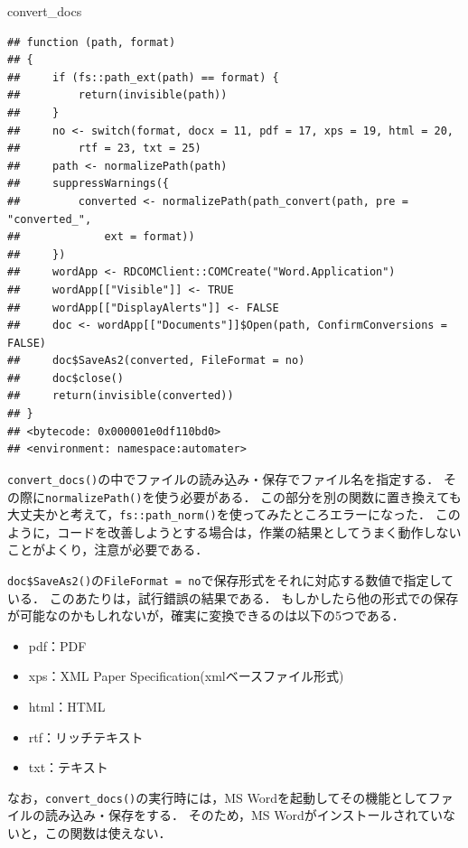 \documentclass[
]{article}
\newenvironment{Shaded}{\begin{snugshade}}{\end{snugshade}}
\newcommand{\NormalTok}[1]{#1}
\providecommand{\tightlist}{%
  \setlength{\itemsep}{0pt}\setlength{\parskip}{0pt}}
\begin{document}
\begin{Shaded}
\begin{Highlighting}[]
\NormalTok{convert\_docs}
\end{Highlighting}
\end{Shaded}

\begin{verbatim}
## function (path, format) 
## {
##     if (fs::path_ext(path) == format) {
##         return(invisible(path))
##     }
##     no <- switch(format, docx = 11, pdf = 17, xps = 19, html = 20, 
##         rtf = 23, txt = 25)
##     path <- normalizePath(path)
##     suppressWarnings({
##         converted <- normalizePath(path_convert(path, pre = "converted_", 
##             ext = format))
##     })
##     wordApp <- RDCOMClient::COMCreate("Word.Application")
##     wordApp[["Visible"]] <- TRUE
##     wordApp[["DisplayAlerts"]] <- FALSE
##     doc <- wordApp[["Documents"]]$Open(path, ConfirmConversions = FALSE)
##     doc$SaveAs2(converted, FileFormat = no)
##     doc$close()
##     return(invisible(converted))
## }
## <bytecode: 0x000001e0df110bd0>
## <environment: namespace:automater>
\end{verbatim}

\texttt{convert\_docs()}の中でファイルの読み込み・保存でファイル名を指定する．
その際に\texttt{normalizePath()}を使う必要がある．
この部分を別の関数に置き換えても大丈夫かと考えて，\texttt{fs::path\_norm()}を使ってみたところエラーになった．
このように，コードを改善しようとする場合は，作業の結果としてうまく動作しないことがよくり，注意が必要である．

\texttt{doc\$SaveAs2()}の\texttt{FileFormat\ =\ no}で保存形式をそれに対応する数値で指定している．
このあたりは，試行錯誤の結果である．
もしかしたら他の形式での保存が可能なのかもしれないが，確実に変換できるのは以下の5つである．

\begin{itemize}
\tightlist
\item
  pdf：PDF
\item
  xps：XML Paper Specification(xmlベースファイル形式)\\
\item
  html：HTML\\
\item
  rtf：リッチテキスト\\
\item
  txt：テキスト
\end{itemize}

なお，\texttt{convert\_docs()}の実行時には，MS Wordを起動してその機能としてファイルの読み込み・保存をする．
そのため，MS Wordがインストールされていないと，この関数は使えない．
\end{document}
